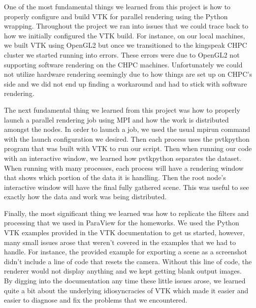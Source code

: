 One of the most fundamental things we learned from this project is how to properly configure and build VTK for parallel rendering using the Python wrapping. Throughout the project we ran into issues that we could trace back to how we initially configured the VTK build. For instance, on our local machines, we built VTK using OpenGL2 but once we transitioned to the kingspeak CHPC cluster we started running into errors. These errors were due to OpenGL2 not supporting software rendering on the CHPC machines. Unfortunately we could not utilize hardware rendering seemingly due to how things are set up on CHPC's side and we did not end up finding a workaround and had to stick with software rendering.

The next fundamental thing we learned from this project was how to properly launch a parallel rendering job using MPI and how the work is distributed amongst the nodes. In order to launch a job, we used the usual mpirun command with the launch configuration we desired. Then each process uses the pvtkpython program that was built with VTK to run our script. Then when running our code with an interactive window, we learned how pvtkpython separates the dataset. When running with many processes, each process will have a rendering window that shows which portion of the data it is handling. Then the root node's interactive window will have the final fully gathered scene. This was useful to see exactly how the data and work was being distributed.

Finally, the most significant thing we learned was how to replicate the filters and processing that we used in ParaView for the homeworks. We used the Python VTK examples provided in the VTK documentation to get us started, however, many small issues arose that weren't covered in the examples that we had to handle. For instance, the provided example for exporting a scene as a screenshot didn't include a line of code that resets the camera. Without this line of code, the renderer would not display anything and we kept getting blank output images. By digging into the documentation any time these little issues arose, we learned quite a bit about the underlying idiosyncracies of VTK which made it easier and easier to diagnose and fix the problems that we encountered.